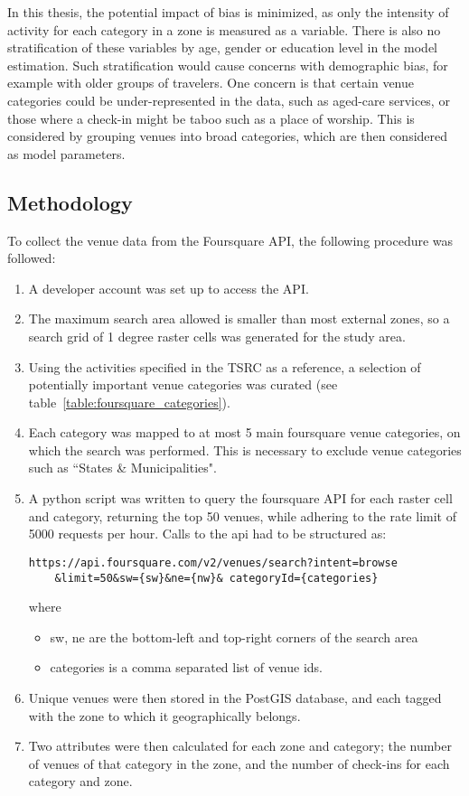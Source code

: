 In this thesis, the potential impact of bias is minimized, as only the intensity of activity for each category in a zone is measured as a variable. There is also no stratification of these variables by age, gender or education level in the model estimation. Such stratification would cause concerns with demographic bias, for example with older groups of travelers. One concern is that certain venue categories could be under-represented in the data, such as aged-care services, or those where a check-in might be taboo such as a place of worship. This is considered by grouping venues into broad categories, which are then considered as model parameters.
	
\subsection{Methodology}
To collect the venue data from the Foursquare API, the following procedure was followed:
\begin{enumerate}

\item A developer account was set up to access the API. 
\item The maximum search area allowed is smaller than most external zones, so a search grid of 1 degree raster cells was generated for the study area. 

\item Using the activities specified in the TSRC as a reference, a selection of potentially important venue categories was curated (see table~\ref{table:foursquare_categories}).

\item Each category was mapped to at most 5 main foursquare venue categories, on which the search was performed. This is necessary to exclude venue categories such as ``States \& Municipalities".

\item A python script was written to query the foursquare API for each raster cell and category, returning the top 50 venues, while adhering to the rate limit of 5000 requests per hour. Calls to the api had to be structured as:
\begin{verbatim}
https://api.foursquare.com/v2/venues/search?intent=browse
    &limit=50&sw={sw}&ne={nw}& categoryId={categories}
\end{verbatim}
where 
\begin{itemize}
\item sw, ne are the bottom-left and top-right corners of the search area
\item categories is a comma separated list of venue ids.
\end{itemize}

\item Unique venues were then stored in the PostGIS database, and each tagged with the zone to which it geographically belongs.
\item Two attributes were then calculated for each zone and category; the number of venues of that category in the zone, and the number of check-ins for each category and zone.
\end{enumerate}

